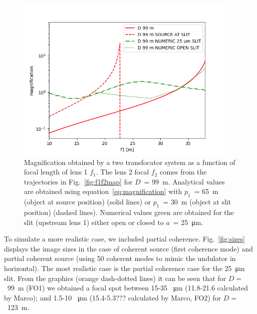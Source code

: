 \documentclass{iucr}              %
\newcommand{\inblue}[1]{{\color{blue}#1}}
\newcommand{\ingreen}[1]{{\color{green}#1}}
\begin{document}
\begin{figure}
    \centering
    \includegraphics[width=0.95\textwidth]{figures/Figure_magnification_99.png}
    \caption{Magnification obtained by a two transfocator system as a function of focal length of lens 1 $f_1$. The lens 2 focal $f_2$ comes from the trajectories in Fig.~\ref{fig:f1f2map} for $D$~= \SI{99}{\meter}. 
    Analytical values are obtained using equation~\ref{eq:magnification} with $p_1$~= \SI{65}{\meter} (object at source position) (solid lines) or $p_1$~= \SI{30}{\meter} (object at slit position) (dashed lines). Numerical values \ingreen{green} are obtained for the slit (upstream lens 1) either open or closed to $a$~= \SI{25}{\micro\meter}. }
    \label{fig:magnification}
\end{figure}


To simulate a more realistic case, we included partial coherence. Fig.~\ref{fig:sizes} displays the image sizes in the case of coherent source (first coherence mode) and partial coherent source (using 50 coherent modes to mimic the undulator in horizontal).
The most realistic case is the partial coherence case for the \SI{25}{\micro\meter} slit. From the graphics (orange dash-dotted lines) it can be seen that for $D=$~\SI{99}{\meter} (FO1) we obtained a focal spot between 15-35 \SI{}{\micro\meter} \inblue{(11.8-21.6 calculated by Marco)}; and 1.5-10 \SI{}{\micro\meter} \inblue{(15.4-5.3??? calculated by Marco, FO2)} for $D=$~\SI{123}{\meter}.  
\end{document}
